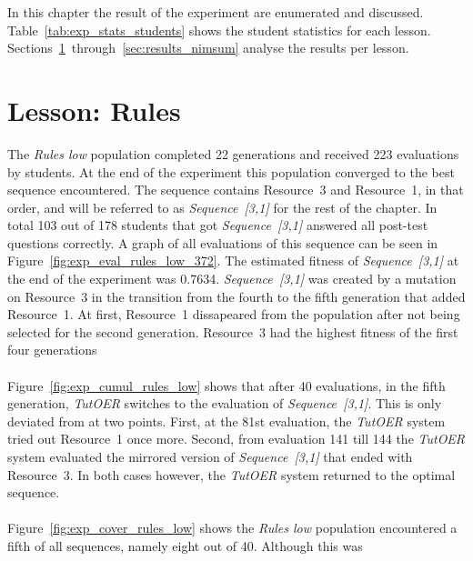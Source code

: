 In this chapter the result of the experiment are enumerated and discussed.
Table~\ref{tab:exp_stats_students} shows the student statistics for each
lesson. Sections~\ref{sec:results_rules}~through~\ref{sec:results_nimsum}
analyse the results per lesson.


\section{Lesson: Rules}
\label{sec:results_rules}
The \emph{Rules low} population completed 22 generations and received 
223 evaluations by students. At the end of the experiment
this population converged to the best sequence encountered. The
sequence contains Resource~3 and Resource~1, in that order, and will be
referred to as \emph{Sequence~[3,1]} for the rest of the chapter. In total 103
out of 178 students that got \emph{Sequence~[3,1]} answered all post-test
questions correctly. A graph of all evaluations of this sequence can be seen in
Figure~\ref{fig:exp_eval_rules_low_372}.
The estimated fitness of \emph{Sequence~[3,1]} at the end of the experiment was
0.7634. \emph{Sequence~[3,1]} was created by a mutation on Resource~3 in the transition
from the fourth to the fifth generation that added Resource~1. At first,
Resource~1 dissapeared from the population after not being selected for the
second generation. Resource~3 had the highest fitness of the first four
generations \\\\
\noindent
Figure~\ref{fig:exp_cumul_rules_low} shows that after 40 evaluations, in the fifth generation, \emph{TutOER}
switches to the evaluation of \emph{Sequence~[3,1]}. This is only deviated from at
two points. First, at the 81st evaluation, the \emph{TutOER} system tried out
Resource~1 once more. Second, from evaluation 141 till 144 the \emph{TutOER}
system evaluated the mirrored version of \emph{Sequence~[3,1]} that ended with
Resource~3. In both cases however, the \emph{TutOER} system returned to the
optimal sequence.\\\\
\noindent
Figure~\ref{fig:exp_cover_rules_low} shows the \emph{Rules low} population
encountered a fifth of all sequences, namely eight out of 40. Although this was
